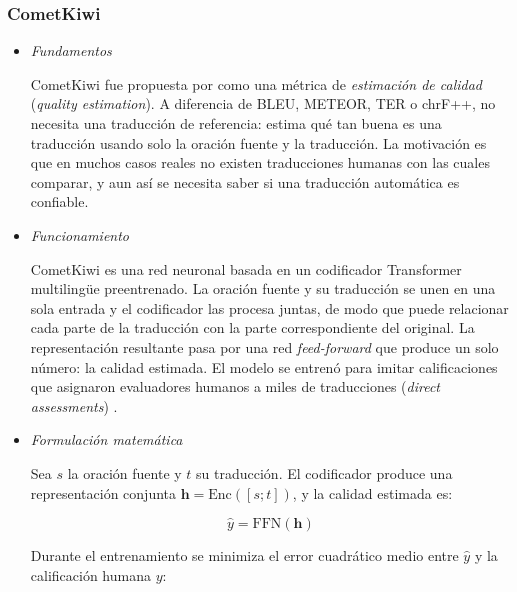  
\subsubsection{CometKiwi}
\label{par:cometkiwi}
\vspace{-0.1cm}
\begin{itemize}
\item \textit{Fundamentos} \\
\vspace{-0.5cm}
 
CometKiwi fue propuesta por \citet{rei2022cometkiwi} como una métrica de \textit{estimación de calidad} (\textit{quality estimation}). A diferencia de BLEU, METEOR, TER o chrF++, no necesita una traducción de referencia: estima qué tan buena es una traducción usando solo la oración fuente y la traducción. La motivación es que en muchos casos reales no existen traducciones humanas con las cuales comparar, y aun así se necesita saber si una traducción automática es confiable.
 
\item \textit{Funcionamiento} \\
\vspace{-0.5cm}
 
CometKiwi es una red neuronal basada en un codificador Transformer multilingüe preentrenado. La oración fuente y su traducción se unen en una sola entrada y el codificador las procesa juntas, de modo que puede relacionar cada parte de la traducción con la parte correspondiente del original. La representación resultante pasa por una red \textit{feed-forward} que produce un solo número: la calidad estimada. El modelo se entrenó para imitar calificaciones que asignaron evaluadores humanos a miles de traducciones (\textit{direct assessments}) \cite{rei2022cometkiwi}.
 
\item \textit{Formulación matemática} \\
\vspace{-0.5cm}
 
Sea $s$ la oración fuente y $t$ su traducción. El codificador produce una representación conjunta $\mathbf{h} = \text{Enc}([s; t])$, y la calidad estimada es:
 
\begin{equation}
\hat{y} = \text{FFN}(\mathbf{h})
\end{equation}
 
Durante el entrenamiento se minimiza el error cuadrático medio entre $\hat{y}$ y la calificación humana $y$:
 

\end{itemize}
